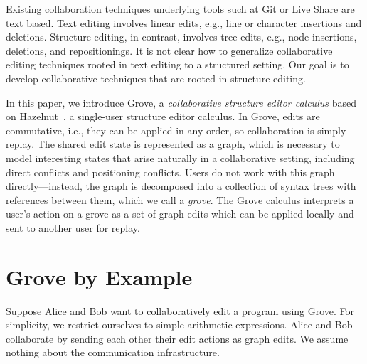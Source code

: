 \documentclass[nonacm, acmsmall, screen, review]{acmart}
\begin{document}
Existing collaboration techniques underlying tools such at Git or Live Share are text based.
Text editing involves linear edits, e.g., line or character insertions and deletions.
Structure editing, in contrast, involves tree edits, e.g., node insertions, deletions, and repositionings.
It is not clear how to generalize collaborative editing techniques rooted in text editing to a structured setting.
Our goal is to develop collaborative techniques that are rooted in structure editing.

In this paper, we introduce Grove, a \emph{collaborative structure editor calculus} based on Hazelnut~\cite{omar_hazelnut_2017}, a single-user structure editor calculus.
In Grove, edits are commutative, i.e., they can be applied in any order, so collaboration is simply replay.
The shared edit state is represented as a graph, which is necessary to model interesting states that arise naturally in a collaborative setting, 
including direct conflicts and positioning conflicts. 
Users do not work with this graph directly---instead, the graph is decomposed into a collection of syntax trees with references between them, which we call a \emph{grove}.
The Grove calculus interprets a user's action on a grove as a set of graph edits which can be applied locally and sent to another user for replay.



\section{Grove by Example}
\label{sec:alice-and-bob}


Suppose Alice and Bob want to collaboratively edit a program using Grove.
For simplicity, we restrict ourselves to simple arithmetic expressions.
Alice and Bob collaborate by sending each other their edit actions as graph edits.
We assume nothing about the communication infrastructure.
\end{document}

